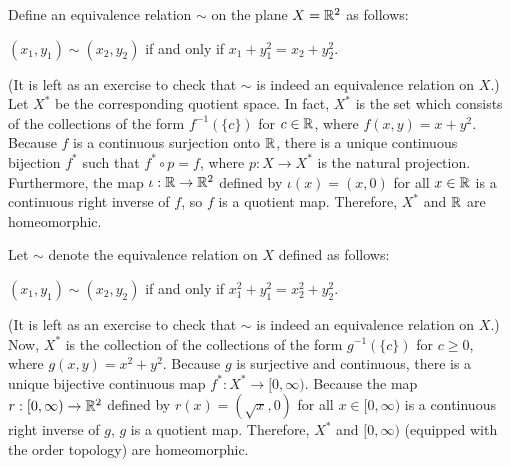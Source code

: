 \begin{exmp}
    Define an equivalence relation $\sim$ on the plane $X={\mathbb{R}}^2$ as follows:
    \begin{center}
        $(x_1, y_1)\sim(x_2, y_2)$ if and only if $x_1+y_1^2=x_2+y_2^2$.
    \end{center}
    \color{brown}(It is left as an exercise to check that $\sim$ is indeed an equivalence relation on $X$.) \color{black}
    Let $X^*$ be the corresponding quotient space.
    In fact, $X^*$ is the set which consists of the collections of the form $f^{-1}(\{c\})$ for $c\in{\mathbb{R}}$, where $f(x, y)=x+y^2$.
    Because $f$ is a continuous surjection onto ${\mathbb{R}}$, there is a unique continuous bijection $f^*$ such that $f^*\circ p=f$, where $p: X\rightarrow X^*$ is the natural projection.
    Furthermore, the map $\iota: {\mathbb{R}}\rightarrow{\mathbb{R}}^2$ defined by $\iota(x)=(x, 0)$ for all $x\in{\mathbb{R}}$ is a continuous right inverse of $f$, so $f$ is a quotient map.
    Therefore, $X^*$ and ${\mathbb{R}}$ are homeomorphic.

    Let $\sim$ denote the equivalence relation on $X$ defined as follows:
    \begin{center}
        $(x_1, y_1)\sim(x_2, y_2)$ if and only if $x_1^2+y_1^2=x_2^2+y_2^2$.
    \end{center}
    \color{brown}(It is left as an exercise to check that $\sim$ is indeed an equivalence relation on $X$.) \color{black}
    Now, $X^*$ is the collection of the collections of the form $g^{-1}(\{c\})$ for $c\geq 0$, where $g(x, y)=x^2+y^2$.
    Because $g$ is surjective and continuous, there is a unique bijective continuous map $f^*: X^*\rightarrow[0, \infty)$.
    Because the map $r: [0, \infty)\rightarrow{\mathbb{R}}^2$ defined by $r(x)=(\sqrt{x}, 0)$ for all $x\in[0, \infty)$ is a continuous right inverse of $g$, $g$ is a quotient map.
    Therefore, $X^*$ and $[0, \infty)$ (equipped with the order topology) are homeomorphic.
\end{exmp}
